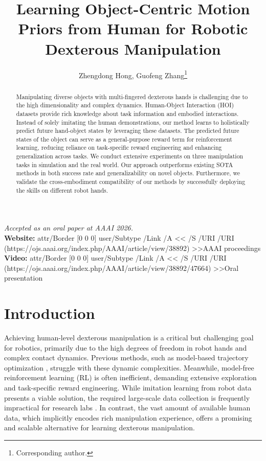 \documentclass[letterpaper]{article}
\title{Learning Object-Centric Motion Priors from Human for Robotic Dexterous Manipulation}
\author{
Zhengdong Hong, Guofeng Zhang\thanks{Corresponding author.}
}
\newcommand{\paperlink}[2]{\leavevmode\pdfstartlink attr{/Border [0 0 0]} user{/Subtype /Link /A << /S /URI /URI (#1) >>}\textcolor{paperlinkblue}{#2}\pdfendlink}
\begin{document}
\maketitle

\begin{abstract}

Manipulating diverse objects with multi-fingered dexterous hands is challenging due to the high dimensionality and complex dynamics. Human-Object Interaction (HOI) datasets provide rich knowledge about task information and embodied interactions. Instead of solely imitating the human demonstrations, our method learns to holistically predict future hand-object states by leveraging these datasets. The predicted future states of the object can serve as a general-purpose reward term for reinforcement learning, reducing reliance on task-specific reward engineering and enhancing generalization across tasks. We conduct extensive experiments on three manipulation tasks in simulation and the real world. Our approach outperforms existing SOTA methods in both success rate and generalizability on novel objects. Furthermore, we validate the cross-embodiment compatibility of our methods by successfully deploying the skills on different robot hands.\end{abstract}

{\small
\noindent\textit{Accepted as an oral paper at AAAI 2026.}\\
\textbf{Website:} \paperlink{https://ojs.aaai.org/index.php/AAAI/article/view/38892}{AAAI proceedings}\\
\textbf{Video:} \paperlink{https://ojs.aaai.org/index.php/AAAI/article/view/38892/47664}{Oral presentation}\par
}

\section{Introduction}
Achieving human-level dexterous manipulation is a critical but challenging goal for robotics, primarily due to the high degrees of freedom in robot hands and complex contact dynamics. Previous methods, such as model-based trajectory optimization \cite{pang2023global, jin2024complementarity}, struggle with these dynamic complexities. Meanwhile, model-free reinforcement learning (RL) \cite{rajeswaran2017learning, gupta2016learning, akkaya2019solving, chen2023visual, wang2024lessons} is often inefficient, demanding extensive exploration and task-specific reward engineering. While imitation learning from robot data \cite{chi2023diffusion} presents a viable solution, the required large-scale data collection is frequently impractical for research labs \cite{wang2024dexcap, black2410pi0}. In contrast, the vast amount of available human data, which implicitly encodes rich manipulation experience, offers a promising and scalable alternative for learning dexterous manipulation.
\end{document}
